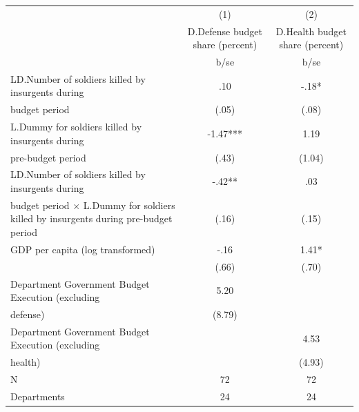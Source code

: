 {
\def\sym#1{\ifmmode^{#1}\else\(^{#1}\)\fi}
\begin{tabular}{l*{2}{c}}
\hline\hline
                                                  &\multicolumn{1}{c}{(1)}&\multicolumn{1}{c}{(2)}\\
                                                  &\multicolumn{1}{c}{D.Defense budget share (percent)}&\multicolumn{1}{c}{D.Health budget share (percent)}\\
                                                  &        b/se   &        b/se   \\
\hline
LD.Number of soldiers killed by insurgents during &         .10   &        -.18*  \\
budget period                                     &       (.05)   &       (.08)   \\
L.Dummy for soldiers killed by insurgents during  &       -1.47***&        1.19   \\
pre-budget period                                 &       (.43)   &      (1.04)   \\
LD.Number of soldiers killed by insurgents during &        -.42** &         .03   \\
budget period $\times$ L.Dummy for soldiers killed by insurgents during pre-budget period&       (.16)   &       (.15)   \\
GDP per capita (log transformed)                  &        -.16   &        1.41*  \\
                                                  &       (.66)   &       (.70)   \\
Department Government Budget Execution (excluding &        5.20   &               \\
defense)                                          &      (8.79)   &               \\
Department Government Budget Execution (excluding &               &        4.53   \\
health)                                           &               &      (4.93)   \\
\hline
N                                                 &          72   &          72   \\
Departments                                       &          24   &          24   \\
\hline\hline
\end{tabular}
}
